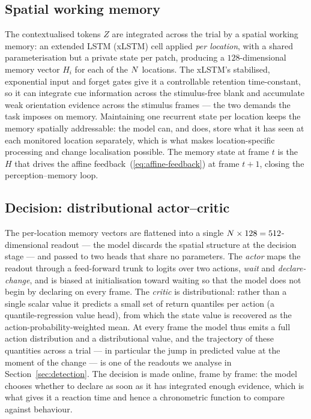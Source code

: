 \subsection{Spatial working memory}
\label{sec:model-memory}

The contextualised tokens $Z$ are integrated across the trial by a
spatial working memory: an extended LSTM (xLSTM) cell applied
\emph{per location}, with a shared parameterisation but a private state
per patch, producing a $128$-dimensional memory vector $H_i$ for each of
the $N$ locations. The xLSTM's stabilised, exponential input and
forget gates give it a controllable retention time-constant, so it can
integrate cue information across the stimulus-free blank and accumulate weak
orientation evidence across the stimulus frames
--- the two demands the task imposes on memory. Maintaining one recurrent
state per location keeps the memory spatially addressable: the model can,
and does, store what it has seen at each monitored location separately,
which is what makes location-specific processing and change localisation
possible. The memory state at frame $t$ is the $H$
that drives the affine feedback~(\ref{eq:affine-feedback}) at frame
$t+1$, closing the perception--memory loop.

\subsection{Decision: distributional actor--critic}
\label{sec:model-heads}

The per-location memory vectors are flattened into a single
$N \times 128 = 512$-dimensional readout --- the model discards the
spatial structure at the decision stage --- and passed to two heads that
share no parameters. The \emph{actor} maps the readout through a
feed-forward trunk to logits over two actions, \emph{wait} and
\emph{declare-change}, and is biased at initialisation toward waiting so
that the model does not begin by declaring on every frame. The
\emph{critic} is distributional: rather than a single scalar value it
predicts a small set of return quantiles per action (a quantile-regression
value head), from which the state value is recovered as the
action-probability-weighted mean. At every frame the model thus emits a
full action distribution and a distributional value, and the trajectory
of these quantities across a trial --- in particular the jump in
predicted value at the moment of the change --- is one of the readouts we
analyse in Section~\ref{sec:detection}. The decision is made online, frame
by frame: the model chooses whether to declare as soon as it has
integrated enough evidence, which is what gives it a reaction time and
hence a chronometric function to compare against behaviour.

